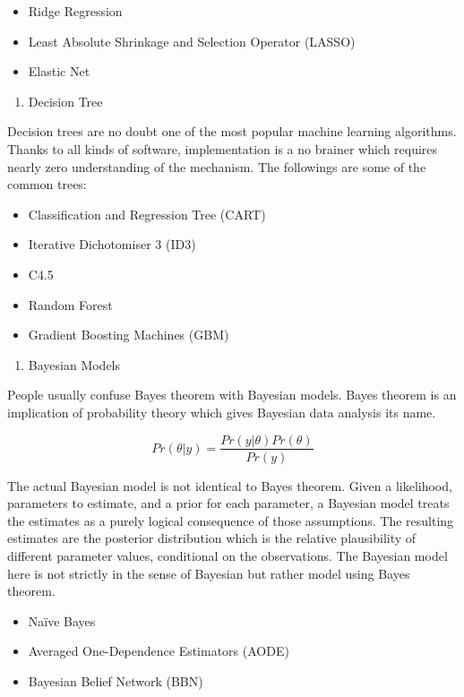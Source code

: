 \documentclass[12pt,]{krantz}
\providecommand{\tightlist}{%
  \setlength{\itemsep}{0pt}\setlength{\parskip}{0pt}}
\theoremstyle{definition}
\theoremstyle{definition}
\theoremstyle{remark}
\begin{document}
\begin{itemize}
\tightlist
\item
  Ridge Regression
\item
  Least Absolute Shrinkage and Selection Operator (LASSO)
\item
  Elastic Net
\end{itemize}

\begin{enumerate}
\def\labelenumi{\arabic{enumi}.}
\setcounter{enumi}{4}
\tightlist
\item
  Decision Tree
\end{enumerate}

Decision trees are no doubt one of the most popular machine learning
algorithms. Thanks to all kinds of software, implementation is a no
brainer which requires nearly zero understanding of the mechanism. The
followings are some of the common trees:

\begin{itemize}
\tightlist
\item
  Classification and Regression Tree (CART)
\item
  Iterative Dichotomiser 3 (ID3)
\item
  C4.5
\item
  Random Forest
\item
  Gradient Boosting Machines (GBM)
\end{itemize}

\begin{enumerate}
\def\labelenumi{\arabic{enumi}.}
\setcounter{enumi}{5}
\tightlist
\item
  Bayesian Models
\end{enumerate}

People usually confuse Bayes theorem with Bayesian models. Bayes theorem
is an implication of probability theory which gives Bayesian data
analysis its name.

\[Pr(\theta|y)=\frac{Pr(y|\theta)Pr(\theta)}{Pr(y)}\]

The actual Bayesian model is not identical to Bayes theorem. Given a
likelihood, parameters to estimate, and a prior for each parameter, a
Bayesian model treats the estimates as a purely logical consequence of
those assumptions. The resulting estimates are the posterior
distribution which is the relative plausibility of different parameter
values, conditional on the observations. The Bayesian model here is not
strictly in the sense of Bayesian but rather model using Bayes theorem.

\begin{itemize}
\tightlist
\item
  Naïve Bayes
\item
  Averaged One-Dependence Estimators (AODE)
\item
  Bayesian Belief Network (BBN)
\end{itemize}
\end{document}
